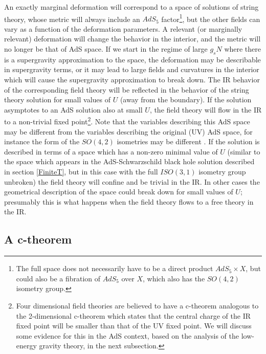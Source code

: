  An exactly marginal deformation will correspond to a space of
 solutions of string theory, whose metric will always include an
 $AdS_5$ factor\footnote{The full space does not necessarily have to
 be a direct product $AdS_5\times X$, but could also be a fibration of
 $AdS_5$ over $X$, which also has the $SO(4,2)$ isometry group.}, but
 the other fields can vary as a function of the deformation
 parameters. A relevant (or marginally relevant) deformation will
 change the behavior in the interior, and the metric will no longer be
 that of AdS space. If we start in the regime of large $g_s N$ where
 there is a supergravity approximation to the space, the deformation
 may be describable in supergravity terms, or it may lead to large
 fields and curvatures in the interior which will cause the
 supergravity approximation to break down. The IR behavior of the
 corresponding field theory will be reflected in the behavior of the
 string theory solution for small values of $U$ (away from the
 boundary). If the solution asymptotes to an AdS solution also at
 small $U$, the field theory will flow in the IR to a non-trivial
 fixed point\footnote{Four dimensional field theories are believed
 \cite{Cardy:1988cw} to have a c-theorem analogous to the
 2-dimensional c-theorem \cite{Zamolodchikov:1986gt} which states that
 the central charge of the IR fixed point will be smaller than that of
 the UV fixed point. We will discuss some evidence for this in 
 the AdS context, based
 on the analysis of the low-energy gravity theory, in the next
 subsection.}.
 Note that the
 variables describing this AdS space may be different from the
 variables describing the original (UV) AdS space, for instance the
 form of the $SO(4,2)$ isometries may be different
 \cite{Distler:1998gb}. If the solution is described in terms of a
 space which has a non-zero minimal value of $U$ (similar to the space
 which appears in the AdS-Schwarzschild black hole solution described
 in section \ref{FiniteT}, but in this case with the full $ISO(3,1)$ isometry
 group unbroken) the field theory will confine and be trivial in the
 IR. In other cases the geometrical description of the space could
 break down for small values of $U$; presumably this is what happens
 when the field theory flows to a free theory in the IR.


\subsection{A c-theorem}
\label{cTheorem}

